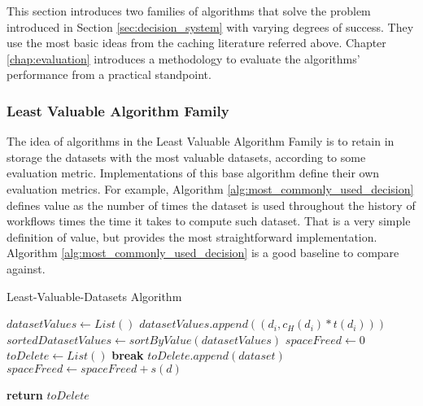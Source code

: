This section introduces two families of algorithms that solve the problem introduced in Section \ref{sec:decision_system} with varying degrees of success. They use the most basic ideas from the caching literature referred above. Chapter \ref{chap:evaluation} introduces a methodology to evaluate the algorithms' performance from a practical standpoint.

\subsubsection{Least Valuable Algorithm Family}
The idea of algorithms in the Least Valuable Algorithm Family is to retain in storage the datasets with the most valuable datasets, according to some evaluation metric. Implementations of this base algorithm define their own evaluation metrics.  For example, Algorithm \ref{alg:most_commonly_used_decision} defines value as the number of times the dataset is used throughout the history of workflows times the time it takes to compute such dataset. That is a very simple definition of value, but provides the most straightforward implementation.  Algorithm \ref{alg:most_commonly_used_decision} is a good baseline to compare against.

\begin{algorithm}
\begin{singlespace}
\caption{Least-Valuable-Datasets Algorithm}
\label{alg:most_commonly_used_decision}
\begin{algorithmic}[1]
	\State $datasetValues \gets List()$
		\State $datasetValues.append((d_i, c_H(d_i) * t(d_i)))$
	\EndFor
	\State $sortedDatasetValues \gets sortByValue(datasetValues)$
	\State $spaceFreed \gets 0$
	\State $toDelete \gets List()$
			\State \textbf{break}
		\EndIf	
		\State $toDelete.append(dataset)$
		\State $spaceFreed \gets spaceFreed + s(d)$
	\EndFor
	
	\State \textbf{return} $toDelete$
\EndProcedure
\end{algorithmic}
\end{singlespace}
\end{algorithm}


